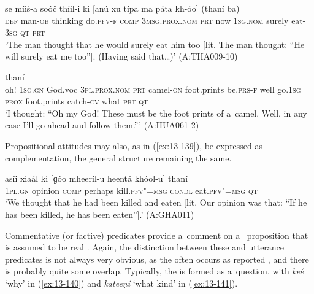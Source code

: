 \begin{exe}
\ex
\label{ex:13-137}
\gll se míiš-a soóč thíil-i ki [anú xu  típa ma páta kh-óo] (thaní ba) \\
\textsc{def } man-\textsc{ob} thinking do.\textsc{pfv-f} \textsc{comp} \textsc{3msg.prox.nom} \textsc{prt}  now \textsc{1sg.nom} surely eat-\textsc{3sg} \textsc{qt} \textsc{prt} \\
\glt `The man thought that he would surely eat him too [lit. The man thought: ``He will surely eat me too'']. (Having said that{\ldots})' (A:THA009-10)

\ex
\label{ex:13-138}
 thaní \\
oh! \textsc{1sg.gn} God.voc \textsc{3pl.prox.nom} \textsc{prt} camel-\textsc{gn}  foot.prints be.\textsc{prs-f} well go.\textsc{1sg} \textsc{prox} foot.prints catch-\textsc{cv} what \textsc{prt} \textsc{qt } \\
\glt `I thought: ``Oh my God! These must be the foot prints of a~camel. Well, in any case I'll go ahead and follow them.''' (A:HUA061-2) 
\end{exe}

Propositional attitudes may also, as in (\ref{ex:13-139}), be expressed as  complementation, the general structure remaining the same.

\begin{exe}
\ex
\label{ex:13-139}
\gll asíi xiaál ki [ɡóo mheeríl-u heentá  khóol-u] thaní \\
\textsc{1pl}.\textsc{gn}  opinion \textsc{comp} perhaps kill.\textsc{pfv"=msg}  \textsc{condl} eat.\textsc{pfv"=msg} \textsc{qt} \\
\glt `We thought that he had been killed and eaten [lit. Our opinion was that: ``If he has been killed, he has been eaten''].' (A:GHA011) 
\end{exe}

 Commentative (or factive) predicates provide a~comment on a~ proposition that is assumed to be real \citep[127--129]{noonan2007}. Again, the distinction between these and utterance predicates is not always very obvious, as the  often occurs as reported , and there is probably quite some overlap. Typically, the  is formed as a~question, with \textit{keé} `why' in (\ref{ex:13-140}) and \textit{kateeṇí} `what kind' in (\ref{ex:13-141}).

